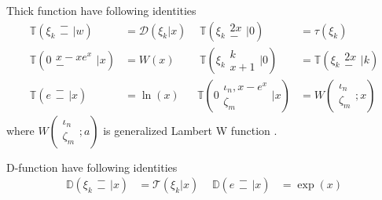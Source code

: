 \begin{theorem}
        Thick function have following identities \cite{32}
        \begin{align}
                \mathbb{T}\left( \xi_k \begin{matrix} - \\ - \end{matrix} \bigg| w \right) &= \mathcal{D}(\xi_k | x) \, & \
                \mathbb{T}\left( \xi_k \begin{matrix} 2x \\ - \end{matrix} \bigg| 0 \right) &= \tau(\xi_k)\\
                \mathbb{T}\left( 0 \begin{matrix} x-xe^x\\ - \end{matrix} \bigg| x \right) &= W(x)\, & \
                \mathbb{T}\left( \xi_k \begin{matrix} k \\ x+1 \end{matrix} \bigg| 0 \right) &= \mathbb{T}\left( 
                \xi_k \begin{matrix} 2x \\ - \end{matrix} \bigg| k \right) \\
                \mathbb{T}\left( e \begin{matrix} - \\ - \end{matrix} \bigg| x \right) &= \ln(x) \, &
                \mathbb{T}\left( 0 \begin{matrix} \iota_n, x-e^x \\ \zeta_m \end{matrix} \bigg| x \right) &=
                W\left( \begin{matrix} \iota_n \\ \zeta_m \end{matrix} \bigg; x \right) \, 
        \end{align}
        where \(W\left( \begin{matrix} \iota_n \\ \zeta_m \end{matrix} \bigg; a \right) \) 
        is generalized Lambert W function \cite{32}.
\end{theorem}

\begin{theorem}
        D-function have following identities
        \begin{align}
                \mathbb{D}\left( \xi_k \begin{matrix} - \\ - \end{matrix} \bigg| x 
                \right) &= \mathcal{T}(\xi_k | x) \, & \
                \mathbb{D}\left( e \begin{matrix} - \\ - 
                \end{matrix} \bigg| x \right) &= \exp(x)
        \end{align}
\end{theorem}

